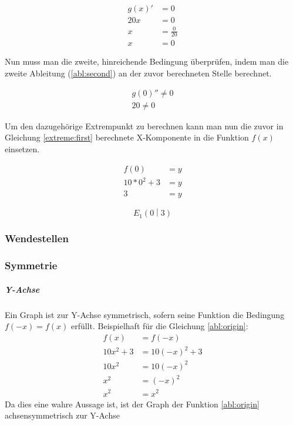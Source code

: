 \documentclass[a4paper]{article}
\begin{document}
				\begin{equation}
					\begin{split}
						g(x)' &= 0\\
						20x &= 0\\
						x &= \frac{0}{20}\\
						x &= 0\label{extreme:first}
					\end{split}
				\end{equation}
				
				Nun muss man die zweite, hinreichende Bedingung überprüfen, indem man die zweite Ableitung (\ref{abl:second}) an der zuvor berechneten Stelle berechnet.
				
				\begin{equation}
					\begin{split}
						g(0)'' \neq 0\\
						20 \neq 0
					\end{split}
				\end{equation}
				
				Um den dazugehörige Extrempunkt zu berechnen kann man nun die zuvor in Gleichung \ref{extreme:first} berechnete X-Komponente in die Funktion $f(x)$ einsetzen.
				
				\begin{equation}
					\begin{split}
						f(0) &= y\\
						10 * 0^2 + 3 &= y\\
						3 &= y
					\end{split}
				\end{equation}
				
				\begin{equation}
					E_1\left(0\middle|3\right)
				\end{equation}
				
			\subsubsection{Wendestellen}
			\subsubsection{Symmetrie}
				\subparagraph{Y-Achse}
					Ein Graph ist zur Y-Achse symmetrisch, sofern seine Funktion die Bedingung $f(-x) = f(x)$ erfüllt. Beispielhaft für die Gleichung \ref{abl:origin}:
					\begin{equation}
						\begin{split}
							f(x) &= f(-x)\\
							10x^2+3 &= 10(-x)^2+3\\
							10x^2 &= 10(-x)^2\\
							x^2 &= (-x)^2\\
							x^2 &= x^2
						\end{split}
					\end{equation}
					Da dies eine wahre Aussage ist, ist der Graph der Funktion \ref{abl:origin} achsensymmetrisch zur Y-Achse
					
\end{document}
